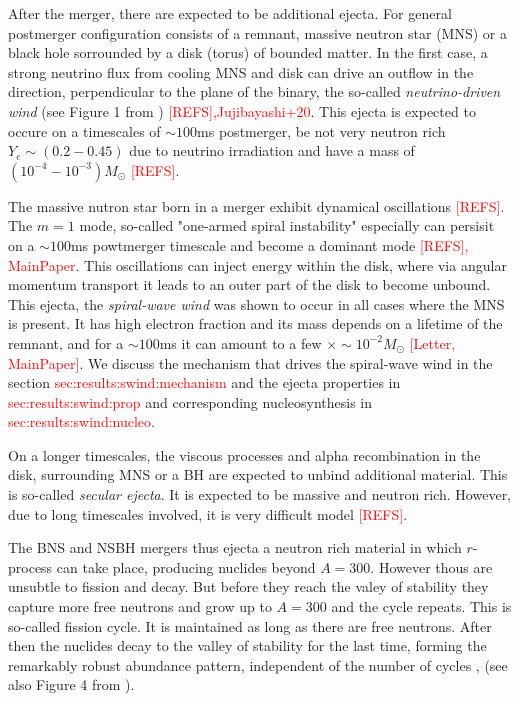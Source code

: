 \documentclass[11pt,a4paper,headinclude=true,DIV=14,BCOR=8mm,chapterprefix,listof=totoc,twoside,openright,abstracton]{scrbook}
\newcommand{\red}[1]{\textcolor{red}{#1}}
\newcommand{\swind}{spiral-wave wind}
\begin{document}
After the merger, there are expected to be additional ejecta. For general postmerger configuration consists of a remnant, massive neutron star (MNS) or a black hole sorrounded by a disk (torus) of bounded matter. In the first case,  a strong neutrino flux from cooling MNS and disk can drive an outflow in the direction, perpendicular to the plane of the binary, the so-called \textit{neutrino-driven wind} (see Figure 1 from \cite{Perego:2014fma}) \red{[REFS],Jujibayashi+20}. This ejecta is expected to occure on a timescales of $\sim100$ms postmerger, be not very neutron rich $Y_e\sim(0.2-0.45)$ due to neutrino irradiation and have a mass of $(10^{-4}-10^{-3})M_{\odot}$ \red{[REFS]}. 

The massive nutron star born in a merger exhibit dynamical oscillations \red{[REFS]}. The $m=1$ mode, so-called "one-armed spiral instability" especially can persisit on a $\sim100$ms powtmerger timescale and become a dominant mode \red{[REFS], MainPaper}. This oscillations can inject energy within the disk, where via angular momentum transport it leads to an outer part of the disk to become unbound. This ejecta, the \textit{\swind{}} was shown to occur in all cases where the MNS is present. It has high electron fraction and its mass depends on a lifetime of the remnant, and for a $\sim100$ms it can amount to a few $\times\sim10^{-2}M_{\odot}$ \red{[Letter, MainPaper]}. We discuss the mechanism that drives the \swind{} in the section \red{sec:results:swind:mechanism} and the ejecta properties in \red{sec:results:swind:prop} and corresponding nucleosynthesis in \red{sec:results:swind:nucleo}.

On a longer timescales, the viscous processes and alpha recombination in the disk, surrounding MNS or a BH are expected to unbind additional material. This is so-called \textit{secular ejecta}. It is expected to be massive and neutron rich. However, due to long timescales involved, it is very difficult model \red{[REFS]}.

The BNS and NSBH mergers thus ejecta a neutron rich material in which $r$-process can take place, producing nuclides beyond $A=300$. However thous are unsubtle to fission and decay. But before they reach the valey of stability they capture more free neutrons and grow up to $A=300$ and the cycle repeats. This is so-called fission cycle. It is maintained as long as there are free neutrons. After then the nuclides decay to the valley of stability for the last time, forming the remarkably robust abundance pattern, independent of the number of cycles \cite{Korobkin:2012uy,Bauswein:2013,Mendoza-Temis:2014mja}, (see also Figure 4 from \cite{Korobkin:2012uy}).\cite{Korobkin:2012uy}
\end{document}
